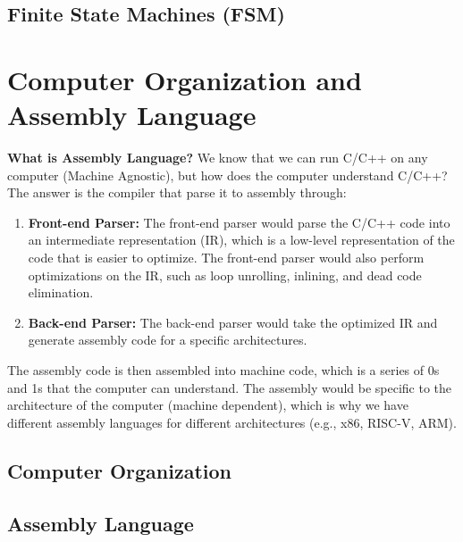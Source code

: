 \documentclass[11pt]{report}
\begin{document}
\section{Finite State Machines (FSM)}

\chapter{Computer Organization and Assembly Language}
\begin{shaded}
\textbf{What is Assembly Language?} We know that we can run C/C++ on any computer (Machine Agnostic), but how does the computer understand C/C++? The answer is the compiler that parse it to assembly through:

\begin{enumerate}
    \item \textbf{Front-end Parser:} The front-end parser would parse the C/C++ code into an intermediate representation (IR), which is a low-level representation of the code that is easier to optimize. The front-end parser would also perform optimizations on the IR, such as loop unrolling, inlining, and dead code elimination.
    \item \textbf{Back-end Parser:} The back-end parser would take the optimized IR and generate assembly code for a specific architectures.
\end{enumerate}
\end{shaded}
The assembly code is then assembled into machine code, which is a series of 0s and 1s that the computer can understand. The assembly would be specific to the architecture of the computer (machine dependent), which is why we have different assembly languages for different architectures (e.g., x86, RISC-V, ARM).
\section{Computer Organization}
\section{Assembly Language}
\end{document}
